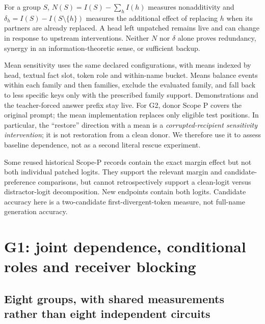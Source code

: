 For a group $S$, $N(S)=I(S)-\sum_h I(h)$ measures nonadditivity and $\delta_h=I(S)-I(S\setminus\{h\})$ measures the additional effect of replacing $h$ when its partners are already replaced. A head left unpatched remains live and can change in response to upstream interventions. Neither $N$ nor $\delta$ alone proves redundancy, synergy in an information-theoretic sense, or sufficient backup.

Mean sensitivity uses the same declared configurations, with means indexed by head, textual fact slot, token role and within-name bucket. Means balance events within each family and then families, exclude the evaluated family, and fall back to less specific keys only with the prescribed family support. Demonstrations and the teacher-forced answer prefix stay live. For G2, donor Scope P covers the original prompt; the mean implementation replaces only eligible test positions. In particular, the ``restore'' direction with a mean is a \emph{corrupted-recipient sensitivity intervention}; it is not restoration from a clean donor. We therefore use it to assess baseline dependence, not as a second literal rescue experiment.

Some reused historical Scope-P records contain the exact margin effect but not both individual patched logits. They support the relevant margin and candidate-preference comparisons, but cannot retrospectively support a clean-logit versus distractor-logit decomposition. New endpoints contain both logits. Candidate accuracy here is a two-candidate first-divergent-token measure, not full-name generation accuracy.
\FloatBarrier

\section{G1: joint dependence, conditional roles and receiver blocking}
\label{sec:s42_g1}
\subsection{Eight groups, with shared measurements rather than eight independent circuits}
\begin{table}[htbp]\centering\footnotesize

\caption{The eight executed G1 rosters. Every group member is replaced at the colon. The source masks in outgoing-group labels describe the route evidence motivating selection; they do not change the members' intervention site. I2 retains the provisional L17H24 nomination.}
\label{tab:s42_groups}
\end{table}

